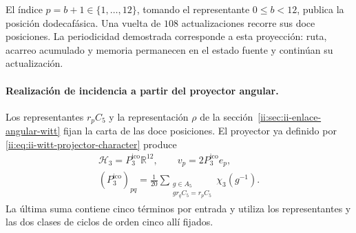 El índice \(p=b+1\in\{1,\ldots,12\}\), tomando el representante
\(0\le b<12\), publica la posición dodecafásica. Una vuelta de
\(108\) actualizaciones recorre sus doce posiciones. La periodicidad
demostrada corresponde a esta proyección: ruta, acarreo acumulado y
memoria permanecen en el estado fuente y continúan su actualización.

\paragraph{Realización de incidencia a partir del proyector angular.}
Los representantes \(r_pC_5\) y la representación \(\rho\) de la
sección~\ref{ii:sec:ii-enlace-angular-witt} fijan la carta de las doce
posiciones. El proyector ya definido por
\eqref{ii:eq:ii-witt-projector-character} produce
\begin{equation}
 \begin{gathered}
 \mathcal H_3=P_3^{\mathrm{ico}}\mathbb R^{12},\qquad v_p=2P_3^{\mathrm{ico}}e_p,
 \\[-2pt]
 (P_3^{\mathrm{ico}})_{pq}=\frac1{20}
 \sum_{\substack{g\in A_5\\gr_qC_5=r_pC_5}}\chi_3(g^{-1}).
 \end{gathered}
 \label{ii:ii:dodeca:vertices-proyector}
\end{equation}
La última suma contiene cinco términos por entrada y utiliza los
representantes y las dos clases de ciclos de orden cinco allí fijados.

